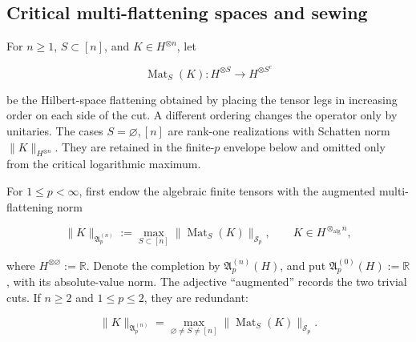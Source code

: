 \documentclass[10pt,reqno]{amsart}
\theoremstyle{plain}
\theoremstyle{definition}
\theoremstyle{remark}
\begin{document}
\subsection{Critical multi-flattening spaces and sewing}
\label{cc:gen-subsection-calculus}

For \(n\geq1\), \(S\subset[n]\), and
\(K\in H^{\otimes n}\), let

\[
 \operatorname{Mat}_S(K):H^{\otimes S}\longrightarrow
 H^{\otimes S^c}
\]

be the Hilbert-space flattening obtained by placing the tensor legs in
increasing order on each side of the cut.  A different ordering changes the
operator only by unitaries.  The cases \(S=\varnothing,[n]\) are rank-one
realizations with Schatten norm \(\|K\|_{H^{\otimes n}}\).  They are retained
in the finite-\(p\) envelope below and omitted only from the critical
logarithmic maximum.

For \(1\leq p<\infty\), first endow the algebraic finite tensors with the
augmented multi-flattening norm

\begin{equation}
 \|K\|_{\mathfrak A_p^{(n)}}
 :=\max_{S\subset[n]}
 \|\operatorname{Mat}_S(K)\|_{\mathcal S_p},
 \qquad K\in H^{\otimes_{\mathrm{alg}}n},
 \label{cc:gen-augmented-schatten-multiflat}
\end{equation}

where \(H^{\otimes\varnothing}:=\mathbb R\).  Denote the completion by
\(\mathfrak A_p^{(n)}(H)\), and put
\(\mathfrak A_p^{(0)}(H):=\mathbb R\), with its absolute-value norm.  The
adjective ``augmented'' records the two trivial cuts.  If \(n\geq2\) and
\(1\leq p\leq2\), they are redundant:

\begin{equation}
 \|K\|_{\mathfrak A_p^{(n)}}
 =\max_{\varnothing\ne S\ne[n]}
 \|\operatorname{Mat}_S(K)\|_{\mathcal S_p}.
 \label{cc:gen-augmented-nontrivial-cuts}
\end{equation}
\end{document}
